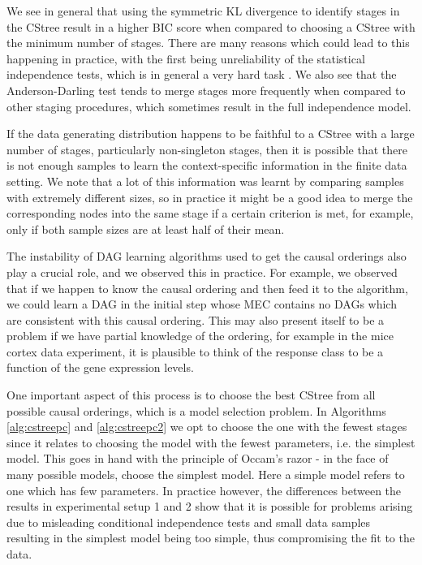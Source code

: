 \documentclass{tufte-book}
\begin{document}
We see in general that using the symmetric KL divergence to identify stages in the CStree result in a higher BIC score when compared to choosing a CStree with the minimum number of stages. There are many reasons which could lead to this happening in practice, with the first being unreliability of the statistical independence tests, which is in general a very hard task \cite{shah-2020-hardn-condit}.  We also see that the Anderson-Darling test tends to merge stages more frequently when compared to other staging procedures, which sometimes result in the full independence model. 


If the data generating distribution happens to be faithful to a CStree with a large number of stages, particularly non-singleton stages, then it is possible that there is not enough samples to learn the context-specific information in the finite data setting. We note that a lot of this information was learnt by comparing samples with extremely different sizes, so in practice it might be a good idea to merge the corresponding nodes into the same stage if a certain criterion is met, for example, only if both sample sizes are at least half of their mean.


The instability of DAG learning algorithms used to get the causal orderings also play a crucial role, and we observed this in practice. For example, we observed that if we happen to know the causal ordering and then feed it to the algorithm, we could learn a DAG in the initial step whose MEC contains no DAGs which are consistent with this causal ordering.  This may also present itself to be a problem if we have partial knowledge of the ordering, for example in the mice cortex data experiment, it is plausible to think of the response class to be a function of the gene expression levels.


One important aspect of this process is to choose the best CStree from all possible causal orderings, which is a model selection problem. In Algorithms \ref{alg:cstreepc} and \ref{alg:cstreepc2} we opt to choose the one with the fewest stages since it relates to choosing the model with the fewest parameters, i.e. the simplest model. This goes in hand with the principle of Occam's razor \cite{pearl-2009-causal} - in the face of many possible models, choose the simplest model. Here a simple model refers to one which has few parameters. In practice however, the differences between the results in experimental setup 1 and 2 show that it is possible for problems arising due to misleading conditional independence tests and small data samples resulting in the simplest model being too simple, thus compromising the fit to the data.
\end{document}
